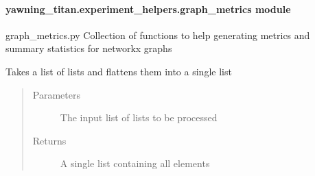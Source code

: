 \documentclass[letterpaper,10pt,english]{sphinxmanual}
\begin{document}
\paragraph{yawning\_titan.experiment\_helpers.graph\_metrics module}
\label{\detokenize{source/yawning_titan.experiment_helpers:module-yawning_titan.experiment_helpers.graph_metrics}}\label{\detokenize{source/yawning_titan.experiment_helpers:yawning-titan-experiment-helpers-graph-metrics-module}}
\sphinxAtStartPar
graph\_metrics.py  \sphinxhyphen{} Collection of functions to help generating metrics and summary statistics for networkx graphs

\begin{fulllineitems}
\label{\detokenize{source/yawning_titan.experiment_helpers:yawning_titan.experiment_helpers.graph_metrics.flatten_list}}
\sphinxAtStartPar
Takes a list of lists and flattens them into a single list
\begin{quote}\begin{description}
\item[{Parameters}] \leavevmode
\sphinxAtStartPar
{} \textendash{} The input list of lists to be processed

\item[{Returns}] \leavevmode
\sphinxAtStartPar
A single list containing all elements

\end{description}\end{quote}

\end{fulllineitems}

\end{document}

